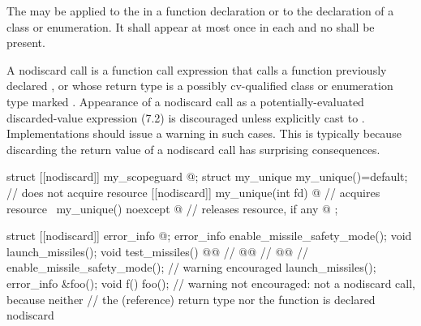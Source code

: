 \documentclass[ebook,11pt,article]{memoir}
\begin{document}
\pnum
The  
may be applied to the 
in a function declaration or to the declaration of a class or enumeration.
It shall appear at most once in each  and
no  shall be present.

\pnum
\begin{note}
A nodiscard call is a function call expression 
that
calls a function 
previously declared , or
whose return type
is a possibly cv-qualified class or enumeration type
marked . Appearance of a nodiscard call as
a potentially-evaluated discarded-value expression (7.2)%
is discouraged unless explicitly cast to .
Implementations should issue a warning in such cases.
This is typically because discarding the return value
of a nodiscard call has surprising consequences.
\end{note}

\pnum
\begin{example}\begin{addedblock}\begin{codeblock}
struct [[nodiscard]] my_scopeguard { @\commentellip@ };
struct my_unique {
  my_unique()=default; // does not acquire resource
  [[nodiscard]] my_unique(int fd) { @\commentellip@ } // acquires resource
  ~my_unique() noexcept { @\commentellip@ } // releases resource, if any
  @\commentellip@
};
\end{codeblock}\end{addedblock}
\begin{codeblock}
struct [[nodiscard]] error_info { @\commentellip@ };
error_info enable_missile_safety_mode();
void launch_missiles();
void test_missiles() {
  @@              // 
  @@                // 
  @@                  // 
  enable_missile_safety_mode(); // warning encouraged
  launch_missiles();
}
error_info &foo();
void f() { foo(); }             // warning not encouraged: not a nodiscard call, because neither
                                // the (reference) return type nor the function is declared nodiscard
\end{codeblock}
\end{example}
\end{document}
